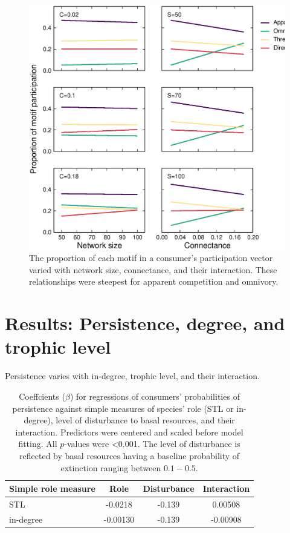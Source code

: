 \documentclass[12pt]{article}
\begin{document}
\begin{spacing}{2.0}
    \begin{figure}[h!]
        \centering
        \includegraphics[height=.5\textheight]{figures/participation_vs_SC.eps}
        \caption{The proportion of each motif in a consumer's participation vector varied with network size, connectance, and their interaction. These relationships were steepest for apparent competition and omnivory.}
        \label{fig:roles_vs_SC}
    \end{figure}
\clearpage 

\section{Results: Persistence, degree, and trophic level}


    Persistence varies with in-degree, trophic level, and their interaction.

    \begin{table}[h!]
        \caption{Coeffcients ($\beta$) for regressions of consumers' probabilities of persistence against simple measures of species' role (STL or in-degree), level of disturbance to basal resources, and their interaction. Predictors were centered and scaled before model fitting. All $p$-values were \textless0.001. The level of disturbance is reflected by basal resources having a baseline probability of extinction ranging between $0.1 - 0.5$.}
        \label{tab:per_vs_TLdeg}
        \centering
        \begin{tabular}{l|c  c  c |}
            Simple role measure & Role & Disturbance & Interaction \\
            \hline
            STL & -0.0218 & -0.139 & 0.00508 \\
            in-degree & -0.00130 & -0.139 & -0.00908 \\
        \end{tabular}
    \end{table}



\end{spacing}
\end{document}
